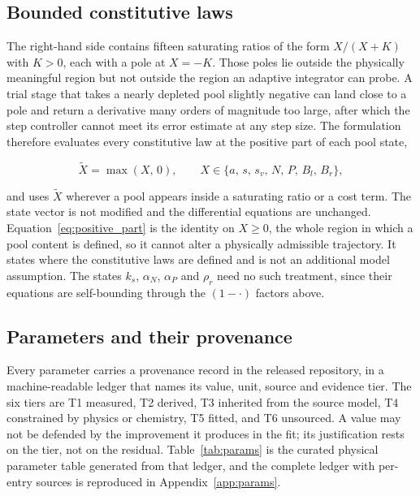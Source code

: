 \subsection{Bounded constitutive laws}
\label{sec:bounded}

The right-hand side contains fifteen saturating ratios of the form $X/(X+K)$ with
$K>0$, each with a pole at $X = -K$. Those poles lie outside the physically
meaningful region but not outside the region an adaptive integrator can probe. A
trial stage that takes a nearly depleted pool slightly negative can land close to a
pole and return a derivative many orders of magnitude too large, after which the
step controller cannot meet its error estimate at any step size. The formulation
therefore evaluates every constitutive law at the positive part of each pool state,

\begin{equation}
\widetilde{X} = \max(X,\,0),
\qquad X \in \{a,\,s,\,s_v,\,N,\,P,\,B_l,\,B_r\},
\label{eq:positive_part}
\end{equation}

and uses $\widetilde{X}$ wherever a pool appears inside a saturating ratio or a
cost term. The state vector is not modified and the differential equations are
unchanged. Equation~\eqref{eq:positive_part} is the identity on $X \geq 0$, the
whole region in which a pool content is defined, so it cannot alter a physically
admissible trajectory. It states where the constitutive laws are defined and is
not an additional model assumption. The states $k_s$, $\alpha_N$, $\alpha_P$ and
$\rho_r$ need no such treatment, since their equations are self-bounding through
the $(1-\cdot)$ factors above.

\subsection{Parameters and their provenance}
\label{sec:params}

Every parameter carries a provenance record in the released repository, in a
machine-readable ledger that names its value, unit, source and evidence tier. The
six tiers are T1 measured, T2 derived, T3 inherited from the source model, T4
constrained by physics or chemistry, T5 fitted, and T6 unsourced. A value may not
be defended by the improvement it produces in the fit; its justification rests on
the tier, not on the residual. Table~\ref{tab:params} is the curated physical
parameter table generated from that ledger, and the complete ledger with
per-entry sources is reproduced in Appendix~\ref{app:params}.

